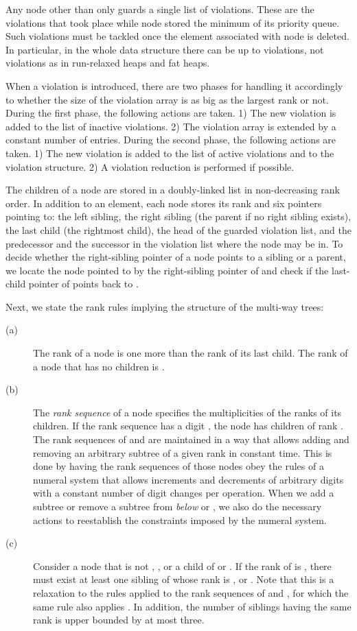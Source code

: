 \documentclass{llncs}
\begin{document}
Any node  other than  only guards a single 
list of  violations. These are the violations that took place while 
node  stored the minimum of its priority queue. Such violations must be 
tackled once the element associated with node  is deleted.  
In particular, in the whole data structure there can be up to  violations, 
not  violations as in run-relaxed heaps and fat heaps. 

When a violation is introduced, there are two phases for handling it accordingly to whether the size of the violation array is as big as the largest rank or not. During the first phase, the following actions are taken.
1) The new violation is added to the list of inactive violations.
2) The violation array is extended by a constant number of entries.
During the second phase, the following actions are taken.
1) The new violation is added to the list of active violations and to the violation structure.
2) A violation reduction is performed if possible.

The children of a node are stored in a doubly-linked list in
non-decreasing rank order. In addition to an element, each node stores
its rank and six pointers pointing to: the left sibling, the right
sibling (the parent if no right sibling exists), the last child (the rightmost child), 
the head of the guarded violation list, and the predecessor and the
successor in the violation list where the node may be in. 
To decide whether the right-sibling pointer of a node  points to a sibling or a
parent, we locate the node  pointed to by the right-sibling pointer of  and check if the
last-child pointer of  points back to .

Next, we state the rank rules implying the structure of the multi-way trees:

\begin{description}
\item[(a)] The rank of a node is one more than the rank of its last
  child.  The rank of a node that has no children is .

\item[(b)] The \emph{rank sequence} of a node specifies the
  multiplicities of the ranks of its children. If the rank sequence
  has a digit , the node has  children of rank . The rank
  sequences of  and  are maintained in a way that allows
  adding and removing an arbitrary subtree of a given rank in constant
  time.  This is done by having the rank sequences of those nodes obey
  the rules of a numeral system that allows increments and decrements
  of arbitrary digits with a constant number of digit changes per
  operation.  When we add a subtree or remove a subtree from
  \emph{below}  or , we also do the necessary actions to
  reestablish the constraints imposed by the numeral system.

\item[(c)] Consider a node  that is not , , or a child of
   or .  If the rank of  is , there must exist at
  least one sibling of  whose rank is ,  or .  Note
  that this is a relaxation to the rules applied to the rank sequences
  of  and , for which the same rule also applies
  \cite{CK77}.  In addition, the number of siblings having the same
  rank is upper bounded by at most three.
\end{description}
\end{document}
